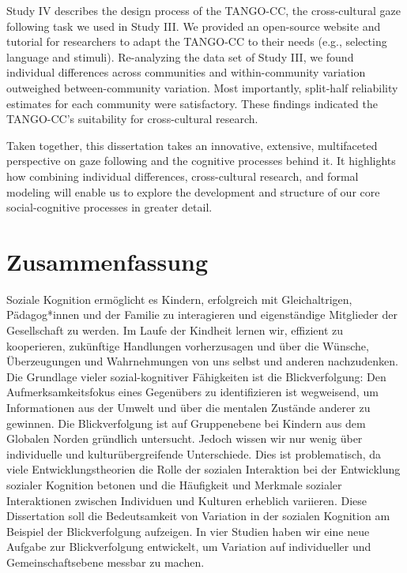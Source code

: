 \documentclass[
]{scrbook}
\begin{document}
Study IV describes the design process of the TANGO-CC, the cross-cultural gaze following task we used in Study III. We provided an open-source website and tutorial for researchers to adapt the TANGO-CC to their needs (e.g., selecting language and stimuli). Re-analyzing the data set of Study III, we found individual differences across communities and within-community variation outweighed between-community variation. Most importantly, split-half reliability estimates for each community were satisfactory. These findings indicated the TANGO-CC's suitability for cross-cultural research.

Taken together, this dissertation takes an innovative, extensive, multifaceted perspective on gaze following and the cognitive processes behind it. It highlights how combining individual differences, cross-cultural research, and formal modeling will enable us to explore the development and structure of our core social-cognitive processes in greater detail.

\chapter{Zusammenfassung}\label{zusammenfassung}

Soziale Kognition ermöglicht es Kindern, erfolgreich mit Gleichaltrigen, Pädagog*innen und der Familie zu interagieren und eigenständige Mitglieder der Gesellschaft zu werden. Im Laufe der Kindheit lernen wir, effizient zu kooperieren, zukünftige Handlungen vorherzusagen und über die Wünsche, Überzeugungen und Wahrnehmungen von uns selbst und anderen nachzudenken. Die Grundlage vieler sozial-kognitiver Fähigkeiten ist die Blickverfolgung: Den Aufmerksamkeitsfokus eines Gegenübers zu identifizieren ist wegweisend, um Informationen aus der Umwelt und über die mentalen Zustände anderer zu gewinnen. Die Blickverfolgung ist auf Gruppenebene bei Kindern aus dem Globalen Norden gründlich untersucht. Jedoch wissen wir nur wenig über individuelle und kulturübergreifende Unterschiede. Dies ist problematisch, da viele Entwicklungstheorien die Rolle der sozialen Interaktion bei der Entwicklung sozialer Kognition betonen und die Häufigkeit und Merkmale sozialer Interaktionen zwischen Individuen und Kulturen erheblich variieren. Diese Dissertation soll die Bedeutsamkeit von Variation in der sozialen Kognition am Beispiel der Blickverfolgung aufzeigen. In vier Studien haben wir eine neue Aufgabe zur Blickverfolgung entwickelt, um Variation auf individueller und Gemeinschaftsebene messbar zu machen.
\end{document}

